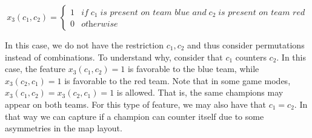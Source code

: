 \[x_3(c_1, c_2) = \begin{cases} 1 & \textit{if} \; c_1 \; \textit{is present on team blue and} \; c_2 \; \textit{is present on team red} \\ 
						  	    0 & \textit{otherwise} \end{cases}\]

In this case, we do not have the restriction $c_1, c_2$ and thus consider permutations instead of combinations.
To understand why, consider that $c_1$ counters $c_2$.
In this case, the feature $x_3(c_1, c_2) = 1$ is favorable to the blue team, while $x_3(c_2, c_1) = 1$ is favorable to the red team.
Note that in some game modes, $x_3(c_1, c_2) = x_3(c_2, c_1) = 1$ is allowed. That is, the same champions may appear on both teams.
For this type of feature, we may also have that $c_1 = c_2$.
In that way we can capture if a champion can counter itself due to some asymmetries in the map layout.

